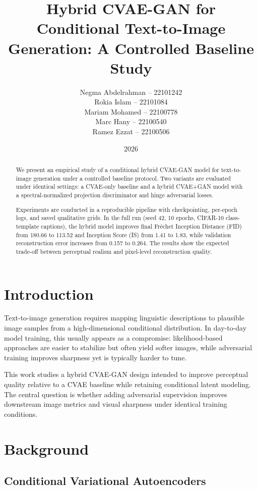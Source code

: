 \documentclass[11pt]{article}
\title{Hybrid CVAE-GAN for Conditional Text-to-Image Generation: \newline A Controlled Baseline Study}
\author{Negma Abdelrahman -- 22101242 \\
Rokia Islam -- 22101084 \\
Mariam Mohamed -- 22100778 \\
Marc Hany -- 22100540 \\
Ramez Ezzat -- 22100506}
\date{2026}
\begin{document}
\maketitle

\begin{abstract}
We present an empirical study of a conditional hybrid CVAE-GAN model for text-to-image generation under a controlled baseline protocol. Two variants are evaluated under identical settings: a CVAE-only baseline and a hybrid CVAE+GAN model with a spectral-normalized projection discriminator and hinge adversarial losses.

Experiments are conducted in a reproducible pipeline with checkpointing, per-epoch logs, and saved qualitative grids. In the full run (seed 42, 10 epochs, CIFAR-10 class-template captions), the hybrid model improves final Fr\'echet Inception Distance (FID) from 180.66 to 113.52 and Inception Score (IS) from 1.41 to 1.83, while validation reconstruction error increases from 0.157 to 0.264. The results show the expected trade-off between perceptual realism and pixel-level reconstruction quality.
\end{abstract}

\section{Introduction}

Text-to-image generation requires mapping linguistic descriptions to plausible image samples from a high-dimensional conditional distribution. In day-to-day model training, this usually appears as a compromise: likelihood-based approaches are easier to stabilize but often yield softer images, while adversarial training improves sharpness yet is typically harder to tune.

This work studies a hybrid CVAE-GAN design intended to improve perceptual quality relative to a CVAE baseline while retaining conditional latent modeling. The central question is whether adding adversarial supervision improves downstream image metrics and visual sharpness under identical training conditions.

\section{Background}

\subsection{Conditional Variational Autoencoders}
\end{document}
